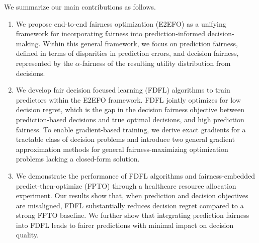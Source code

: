 \documentclass[ijoc,sglanonrev]{informs4}
\begin{document}
We summarize our main contributions as follows. 
\begin{enumerate}
    \item We propose end-to-end fairness optimization (E2EFO) as a unifying framework for incorporating fairness into prediction-informed decision-making. Within this general framework, we focus on prediction fairness, defined in terms of disparities in prediction errors, and decision fairness, represented by the $\alpha$-fairness of the resulting utility distribution from decisions.
    \item We develop fair decision focused learning (FDFL) algorithms to train predictors within the E2EFO framework. FDFL jointly optimizes for low decision regret, which is the gap in the decision fairness objective between prediction-based decisions and true optimal decisions, and high prediction fairness. To enable gradient-based training, we derive exact gradients for a tractable class of decision problems and introduce two general gradient approximation methods for general fairness-maximizing optimization problems lacking a closed-form solution.
    \item We demonstrate the performance of FDFL algorithms and fairness-embedded predict-then-optimize (FPTO) through a healthcare resource allocation experiment. Our results show that, when prediction and decision objectives are misaligned, FDFL substantially reduces decision regret compared to a strong FPTO baseline. We further show that integrating prediction fairness into FDFL leads to fairer predictions with minimal impact on decision quality.
\end{enumerate}
\end{document}
